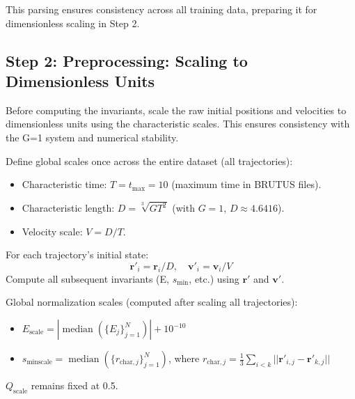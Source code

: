 \documentclass{article}
\DeclareMathOperator{\median}{median}
\begin{document}
This parsing ensures consistency across all training data, preparing it for dimensionless scaling in Step 2.










\subsection{Step 2: Preprocessing: Scaling to Dimensionless Units}

Before computing the invariants, scale the raw initial positions and velocities to dimensionless units using the characteristic scales. This ensures consistency with the G=1 system and numerical stability.

Define global scales once across the entire dataset (all trajectories):
\begin{itemize}
    \item Characteristic time: \(T = t_{\max} = 10\) (maximum time in BRUTUS files).
    \item Characteristic length: \(D = \sqrt[3]{G T^2}\) (with \(G=1\), \(D \approx 4.6416\)).
    \item Velocity scale: \(V = D / T\).
\end{itemize}

For each trajectory's initial state:
\begin{equation*}
\mathbf{r}'_i = \mathbf{r}_i / D, \quad \mathbf{v}'_i = \mathbf{v}_i / V
\end{equation*}
Compute all subsequent invariants (E, \(s_{\min}\), etc.) using \(\mathbf{r}'\) and \(\mathbf{v}'\).

Global normalization scales (computed after scaling all trajectories):
\begin{itemize}
    \item \(E_{\text{scale}} = |\median(\{E_j\}_{j=1}^N)| + 10^{-10}\)
    \item \(s_{\min\text{scale}} = \median(\{r_{\text{char},j}\}_{j=1}^N)\), where \(r_{\text{char},j} = \frac{1}{3} \sum_{i<k} ||\mathbf{r}'_{i,j} - \mathbf{r}'_{k,j}||\)
\end{itemize}
\(Q_{\text{scale}}\) remains fixed at 0.5.
\end{document}

